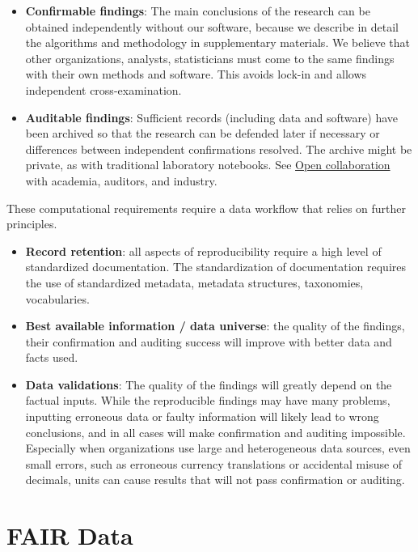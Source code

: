 \documentclass[
  a4paper,
  openany, a4paper, oneside]{book}
\begin{document}
\begin{itemize}
\item
  \textbf{Confirmable findings}: The main conclusions of the research can be obtained independently without our software, because we describe in detail the algorithms and methodology in supplementary materials. We believe that other organizations, analysts, statisticians must come to the same findings with their own methods and software. This avoids lock-in and allows independent cross-examination.
\item
  \textbf{Auditable findings}: Sufficient records (including data and software) have been archived so that the research can be defended later if necessary or differences between independent confirmations resolved. The archive might be private, as with traditional laboratory notebooks. See \protect\hyperlink{opencollaboration}{Open collaboration} with academia, auditors, and industry.
\end{itemize}

These computational requirements require a data workflow that relies on further principles.

\begin{itemize}
\item
  \textbf{Record retention}: all aspects of reproducibility require a high level of standardized documentation. The standardization of documentation requires the use of standardized metadata, metadata structures, taxonomies, vocabularies.
\item
  \textbf{Best available information / data universe}: the quality of the findings, their confirmation and auditing success will improve with better data and facts used.
\item
  \textbf{Data validations}: The quality of the findings will greatly depend on the factual inputs. While the reproducible findings may have many problems, inputting erroneous data or faulty information will likely lead to wrong conclusions, and in all cases will make confirmation and auditing impossible. Especially when organizations use large and heterogeneous data sources, even small errors, such as erroneous currency translations or accidental misuse of decimals, units can cause results that will not pass confirmation or auditing.
\end{itemize}

\hypertarget{FAIR-data}{%
\chapter{FAIR Data}\label{FAIR-data}}
\end{document}
